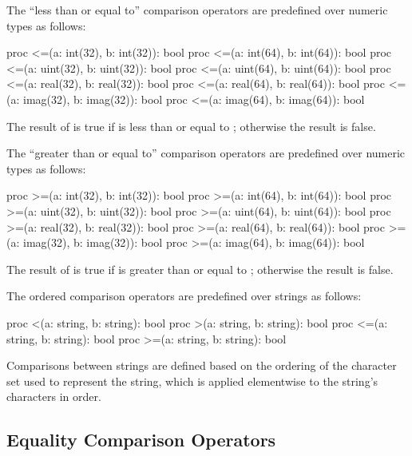 The ``less than or equal to'' comparison operators are predefined over
numeric types as follows:
\begin{chapel}
proc <=(a: int(32), b: int(32)): bool
proc <=(a: int(64), b: int(64)): bool
proc <=(a: uint(32), b: uint(32)): bool
proc <=(a: uint(64), b: uint(64)): bool
proc <=(a: real(32), b: real(32)): bool
proc <=(a: real(64), b: real(64)): bool
proc <=(a: imag(32), b: imag(32)): bool
proc <=(a: imag(64), b: imag(64)): bool
\end{chapel}
The result of  is true if  is less than or equal
to ; otherwise the result is false.

The ``greater than or equal to'' comparison operators are predefined
over numeric types as follows:
\begin{chapel}
proc >=(a: int(32), b: int(32)): bool
proc >=(a: int(64), b: int(64)): bool
proc >=(a: uint(32), b: uint(32)): bool
proc >=(a: uint(64), b: uint(64)): bool
proc >=(a: real(32), b: real(32)): bool
proc >=(a: real(64), b: real(64)): bool
proc >=(a: imag(32), b: imag(32)): bool
proc >=(a: imag(64), b: imag(64)): bool
\end{chapel}
The result of  is true if  is greater than or
equal to ; otherwise the result is false.

The ordered comparison operators are predefined over strings as follows:
\begin{chapel}
proc <(a: string, b: string): bool
proc >(a: string, b: string): bool
proc <=(a: string, b: string): bool
proc >=(a: string, b: string): bool
\end{chapel}
Comparisons between strings are defined based on the ordering of the
character set used to represent the string, which is applied
elementwise to the string's characters in order.


\subsection{Equality Comparison Operators}
\label{Equality_Comparison_Operators}

